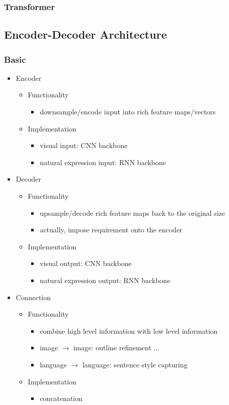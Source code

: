 \subsubsection{Transformer}

\subsection{Encoder-Decoder Architecture}
\subsubsection{Basic}
\begin{itemize}
\item Encoder
	\begin{itemize}
	\item Functionality
		\begin{itemize}
		\item downsample/encode input into rich feature maps/vectors
		\end{itemize}
	\item Implementation
		\begin{itemize}
		\item visual input: CNN backbone
		\item natural expression input: RNN backbone
		\end{itemize}
	\end{itemize}
\item Decoder
	\begin{itemize}
	\item Functionality
		\begin{itemize}
		\item upsample/decode rich feature maps back to the original size
		\item actually, impose requirement onto the encoder
		\end{itemize}
	\item Implementation
		\begin{itemize}
		\item visual output: CNN backbone
		\item natural expression output: RNN backbone
		\end{itemize}
	\end{itemize}
\item Connection
	\begin{itemize}
	\item Functionality
		\begin{itemize}
		\item combine high level information with low level information
		\item image $\rightarrow$ image: outline refinement ...
		\item language $\rightarrow$ language: sentence style capturing
		\end{itemize}
	\item Implementation
		\begin{itemize}
		\item concatenation
		\end{itemize}
	\end{itemize}
\end{itemize}
